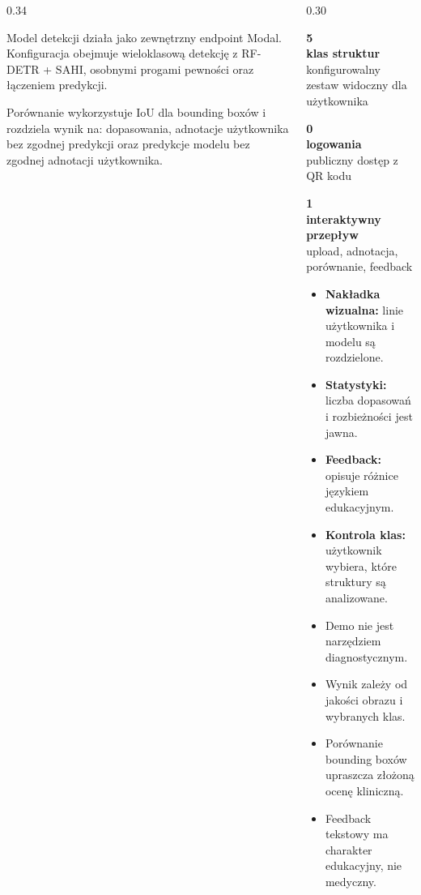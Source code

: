 \documentclass[final]{beamer}
\newcommand{\sectioncard}[2]{
  \begin{tcolorbox}[medicalcard,title={#1}]
    \justifying
    #2
  \end{tcolorbox}
}
\newcommand{\metricbox}[3]{
  \begin{tcolorbox}[
    enhanced,
    colback=PaleAqua,
    colframe=PaleAqua,
    arc=10mm,
    boxrule=0pt,
    width=\linewidth,
    left=10mm,
    right=10mm,
    top=8mm,
    bottom=8mm
  ]
    {\Huge\bfseries\color{DarkTeal}#1}\\[0.2em]
    {\Large\bfseries #2}\\
    {\normalsize\color{MutedTeal}#3}
  \end{tcolorbox}
}
\begin{document}
\begin{frame}[t]
\begin{columns}[T,totalwidth=\textwidth]
\begin{column}{0.34\textwidth}
    \begin{tcolorbox}[medicalcard,title={Miejsce na zrzut ekranu demo}]
    \end{tcolorbox}

    \sectioncard{Model i porównanie}{
      Model detekcji działa jako zewnętrzny endpoint Modal.
      Konfiguracja obejmuje wieloklasową detekcję z RF-DETR + SAHI,
      osobnymi progami pewności oraz łączeniem predykcji.

      \vspace{0.4em}
      Porównanie wykorzystuje IoU dla bounding boxów i rozdziela wynik na:
      dopasowania, adnotacje użytkownika bez zgodnej predykcji oraz predykcje
      modelu bez zgodnej adnotacji użytkownika.
    }
  \end{column}

  \begin{column}{0.30\textwidth}
    \sectioncard{Co pokazujemy?}{
      \metricbox{5}{klas struktur}{konfigurowalny zestaw widoczny dla użytkownika}
      \vspace{0.5em}
      \metricbox{0}{logowania}{publiczny dostęp z QR kodu}
      \vspace{0.5em}
      \metricbox{1}{interaktywny przepływ}{upload, adnotacja, porównanie, feedback}
    }

    \sectioncard{Najważniejsze elementy XAI}{
      \begin{itemize}
        \item \textbf{Nakładka wizualna:} linie użytkownika i modelu są rozdzielone.
        \item \textbf{Statystyki:} liczba dopasowań i rozbieżności jest jawna.
        \item \textbf{Feedback:} opisuje różnice językiem edukacyjnym.
        \item \textbf{Kontrola klas:} użytkownik wybiera, które struktury są analizowane.
      \end{itemize}
    }

    \sectioncard{Ograniczenia}{
      \begin{itemize}
        \item Demo nie jest narzędziem diagnostycznym.
        \item Wynik zależy od jakości obrazu i wybranych klas.
        \item Porównanie bounding boxów upraszcza złożoną ocenę kliniczną.
        \item Feedback tekstowy ma charakter edukacyjny, nie medyczny.
      \end{itemize}
    }


\end{column}
\end{columns}
\end{frame}
\end{document}
